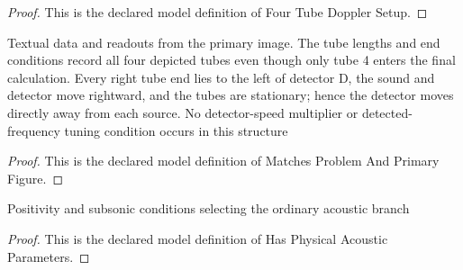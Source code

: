 \begin{proof}
  This is the declared model definition of Four Tube Doppler Setup.
\end{proof}
\begin{definition}
  \label{def:physics:phyx-mini-0320:phyxminiproblems-problemphyxmini0320-matchesproblemandprimaryfigure}
  Textual data and readouts from the primary image. The tube lengths and end conditions record all four depicted tubes even though only tube 4 enters the final calculation. Every right tube end lies to the left of detector D, the sound and detector move rightward, and the tubes are stationary; hence the detector moves directly away from each source. No detector-speed multiplier or detected-frequency tuning condition occurs in this structure
\end{definition}
\begin{proof}
  This is the declared model definition of Matches Problem And Primary Figure.
\end{proof}
\begin{definition}
  \label{def:physics:phyx-mini-0320:phyxminiproblems-problemphyxmini0320-hasphysicalacousticparameters}
  Positivity and subsonic conditions selecting the ordinary acoustic branch
\end{definition}
\begin{proof}
  This is the declared model definition of Has Physical Acoustic Parameters.
\end{proof}
